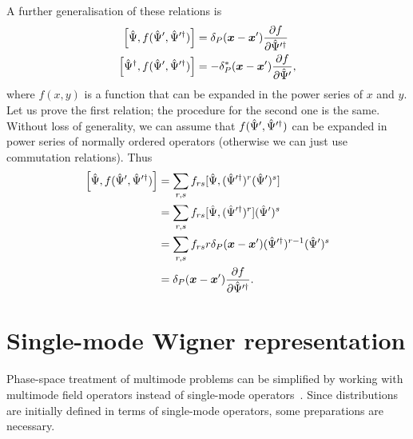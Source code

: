 A further generalisation of these relations is
\begin{equation}
\label{eqn:multimode-formalism:functional-commutators}
\begin{split}
	\left[ \hat{\Psi}, f( \hat{\Psi}^\prime, \hat{\Psi}^{\prime\dagger} ) \right]
	& = \delta_P (\boldsymbol{x} - \boldsymbol{x}^\prime) \frac{\partial f}{\partial \hat{\Psi}^{\prime\dagger}} \\
	\left[ \hat{\Psi}^\dagger, f( \hat{\Psi}^\prime, \hat{\Psi}^{\prime\dagger} ) \right]
	& = -\delta_P^* (\boldsymbol{x} - \boldsymbol{x}^\prime) \frac{\partial f}{\partial \hat{\Psi}^\prime},
\end{split}
\end{equation}
where $f(x, y)$ is a function that can be expanded in the power series of $x$ and $y$.
Let us prove the first relation; the procedure for the second one is the same.
Without loss of generality, we can assume that $f(\hat{\Psi}^\prime, \hat{\Psi}^{\prime\dagger})$ can be expanded in power series of normally ordered operators (otherwise we can just use commutation relations).
Thus
\begin{equation*}
\begin{split}
	\left[ \hat{\Psi}, f( \hat{\Psi}^\prime, \hat{\Psi}^{\prime\dagger} ) \right]
	& = \sum\limits_{r,s} f_{rs} [ \hat{\Psi}, (\hat{\Psi}^{\prime\dagger})^r (\hat{\Psi}^\prime)^s ] \\
	& = \sum\limits_{r,s} f_{rs} [ \hat{\Psi}, (\hat{\Psi}^{\prime\dagger})^r ] (\hat{\Psi}^\prime)^s \\
	& = \sum\limits_{r,s} f_{rs} r \delta_P(\boldsymbol{x} - \boldsymbol{x}^\prime)
		(\hat{\Psi}^{\prime\dagger})^{r-1} (\hat{\Psi}^\prime)^s \\
	& = \delta_P (\boldsymbol{x} - \boldsymbol{x}^\prime) \frac{\partial f}{\partial \hat{\Psi}^{\prime\dagger}}.
\end{split}
\end{equation*}


\section{Single-mode Wigner representation}

Phase-space treatment of multimode problems can be simplified by working with multimode field operators instead of single-mode operators~\cite{Steel1998,Norrie2006a}.
Since distributions are initially defined in terms of single-mode operators, some preparations are necessary.

